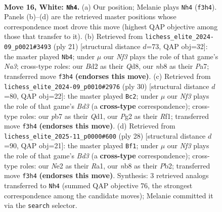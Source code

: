\documentclass[11pt]{article}
\begin{document}
\clearpage

\begin{figure}[p]\centering
\begin{subfigure}{0.46\textwidth}\centering
\resizebox{\linewidth}{!}{%
\newchessgame
\chessboard[
  setfen={1nr3k1/rp1b1ppp/p1qbpn2/8/8/3BPN2/PP1BNPPP/R2QR1K1 w - - 12 16},
  showmover=false,
  pgfstyle=straightmove, color=movearrow, markmove={f3-h4}
]}
\caption{}
\end{subfigure}\hfill
\begin{subfigure}{0.46\textwidth}\centering
\resizebox{\linewidth}{!}{%
\newchessgame
\chessboard[
  setfen={r2q1rk1/pp1b1pbp/n2p1np1/2pP4/P7/2N2N1P/1PP1BPP1/R1BQ1RK1 b - - 2 11},
  showmover=false,
  pgfstyle=straightmove, color=movearrow, markmove={a6-b4}
]}
\caption{}
\end{subfigure}
\\[4pt]
\begin{subfigure}{0.46\textwidth}\centering
\resizebox{\linewidth}{!}{%
\newchessgame
\chessboard[
  setfen={r1bqr1k1/1p2bp1p/p4np1/P1np4/8/2NBPP2/1P2NBPP/R2Q1RK1 w - - 0 16},
  showmover=false,
  pgfstyle=straightmove, color=movearrow, markmove={d3-c2}
]}
\caption{}
\end{subfigure}\hfill
\begin{subfigure}{0.46\textwidth}\centering
\resizebox{\linewidth}{!}{%
\newchessgame
\chessboard[
  setfen={r1bq1rk1/pp2bppp/2n5/4n3/3pN3/PN1B3P/1PPB1PP1/R2QR1K1 w - - 1 15},
  showmover=false,
  pgfstyle=straightmove, color=movearrow, markmove={d3-f1}
]}
\caption{}
\end{subfigure}
\caption{\textbf{Move 16, White: \texttt{Nh4}.} (a) Our position; Melanie plays \texttt{Nh4} (\texttt{f3h4}). Panels (b)--(d) are the retrieved master positions whose correspondence most drove this move (highest QAP objective among those that transfer to it). (b) Retrieved from \texttt{lichess\_elite\_2024-09\_p0021\#3493} (ply 21) [structural distance $d$=73, QAP obj=32]: the master played \texttt{Nb4}; under $\mu$ our \emph{Nf3} plays the role of that game's \emph{Na3}; cross-type roles: our \emph{B}d2 as their \emph{Q}d8, our \emph{n}b8 as their \emph{P}a7; transferred move \texttt{f3h4} \textbf{(endorses this move)}. (c) Retrieved from \texttt{lichess\_elite\_2024-09\_p0010\#2976} (ply 30) [structural distance $d$=80, QAP obj=22]: the master played \texttt{Bc2}; under $\mu$ our \emph{Nf3} plays the role of that game's \emph{Bd3} (a \textbf{cross-type} correspondence); cross-type roles: our \emph{p}b7 as their \emph{Q}d1, our \emph{P}g2 as their \emph{R}f1; transferred move \texttt{f3h4} \textbf{(endorses this move)}. (d) Retrieved from \texttt{lichess\_elite\_2025-11\_p0000\#600} (ply 28) [structural distance $d$=90, QAP obj=21]: the master played \texttt{Bf1}; under $\mu$ our \emph{Nf3} plays the role of that game's \emph{Bd3} (a \textbf{cross-type} correspondence); cross-type roles: our \emph{N}e2 as their \emph{R}a1, our \emph{n}b8 as their \emph{P}b2; transferred move \texttt{f3h4} \textbf{(endorses this move)}. Synthesis: 3 retrieved analogs transferred to \texttt{Nh4} (summed QAP objective 76, the strongest correspondence among the candidate moves); Melanie committed it via the \texttt{search} selector.}
\label{fig:thought-m30}
\end{figure}
\end{document}
